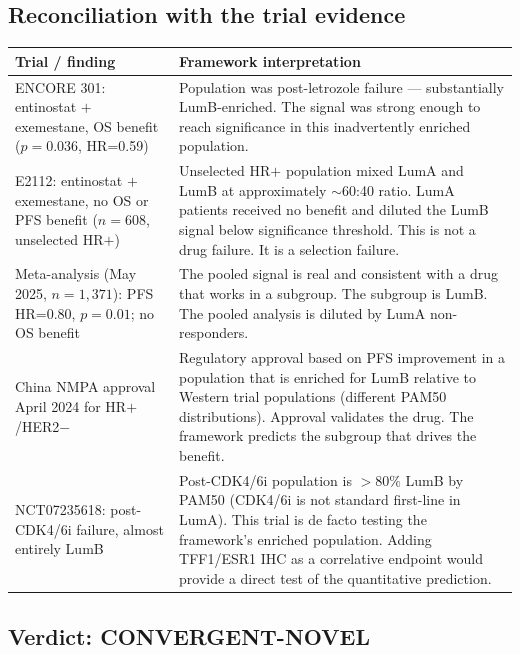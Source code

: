 \documentclass[12pt, a4paper]{article}
\begin{document}
\subsection{Reconciliation with the trial evidence}

\begin{center}
\begin{tabular}{p{4cm}p{8.5cm}}
\toprule
\textbf{Trial / finding}
& \textbf{Framework interpretation} \\
\midrule
ENCORE 301:
entinostat $+$ exemestane,
OS benefit ($p=0.036$, HR=0.59)
& Population was post-letrozole failure ---
  substantially LumB-enriched. The signal was
  strong enough to reach significance in this
  inadvertently enriched population. \\[0.8em]

E2112:
entinostat $+$ exemestane,
no OS or PFS benefit ($n=608$,
unselected HR$+$)
& Unselected HR$+$ population mixed LumA and
  LumB at approximately $\sim$60:40 ratio.
  LumA patients received no benefit and diluted
  the LumB signal below significance threshold.
  This is not a drug failure. It is a selection
  failure. \\[0.8em]

Meta-analysis (May 2025,
$n=1{,}371$):
PFS HR=0.80, $p=0.01$;
no OS benefit
& The pooled signal is real and consistent with
  a drug that works in a subgroup. The subgroup
  is LumB. The pooled analysis is diluted by
  LumA non-responders. \\[0.8em]

China NMPA approval
April 2024 for HR$+$/HER2$-$
& Regulatory approval based on PFS improvement
  in a population that is enriched for LumB
  relative to Western trial populations (different
  PAM50 distributions). Approval validates the drug.
  The framework predicts the subgroup that drives
  the benefit. \\[0.8em]

NCT07235618:
post-CDK4/6i failure,
almost entirely LumB
& Post-CDK4/6i population is $>80\%$ LumB by
  PAM50 (CDK4/6i is not standard first-line in
  LumA). This trial is de facto testing the
  framework's enriched population. Adding TFF1/ESR1
  IHC as a correlative endpoint would provide a
  direct test of the quantitative prediction. \\
\bottomrule
\end{tabular}
\end{center}

\subsection{Verdict: CONVERGENT-NOVEL}
\end{document}
